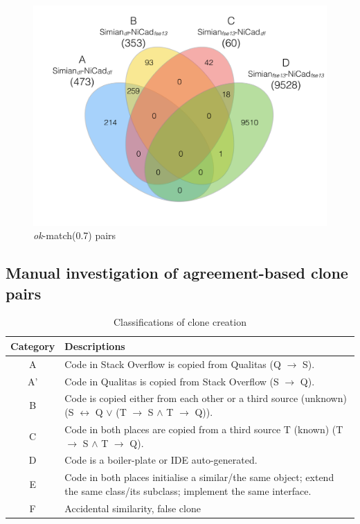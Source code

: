 \documentclass{sig-alternate-05-2015}
\begin{document}
\begin{figure}
		\centering
		\includegraphics[width=0.9\linewidth]{venn4_pairs_ok}
		\caption{\textit{ok}-match(0.7) pairs}
		\label{fig:venn4_orig_ok}
\end{figure}

\subsection{Manual investigation of agreement-based clone pairs}


\begin{table}
	\centering
	\caption{Classifications of clone creation}
	\label{tab:classification_scheme}
	\begin{tabular}{|c|p{13cm}|}
		\hline 
		Category & Descriptions \\ 
		\hline 
		A & Code in Stack Overflow is copied from Qualitas (Q $\rightarrow$ S). \\ 
		\hline 
		A' & Code in Qualitas is copied from Stack Overflow (S $\rightarrow$ Q). \\ 
		\hline 
		B & Code is copied either from each other or a third source (unknown) (S $\leftrightarrow$ Q $\vee$ (T $\rightarrow$ S $\wedge$ T $\rightarrow$ Q)).
		\\ 
		\hline 
		C & Code in both places are copied from a third source T (known) (T $\rightarrow$ S $\wedge$ T $\rightarrow$ Q).
		\\ 
		\hline 
		D & Code is a boiler-plate or IDE auto-generated.
		\\ 
		\hline 
		E & Code in both places initialise a similar/the same object; extend the same class/its subclass; implement the same interface.
		\\ 
		\hline 
		F & Accidental similarity, false clone \\ 
		\hline 
	\end{tabular} 
\end{table}
\end{document}
